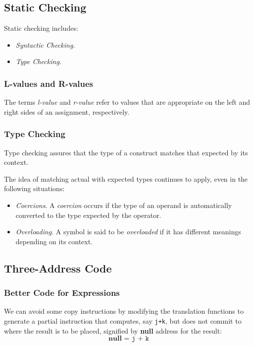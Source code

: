 \documentclass[a4paper,twoside]{book}
\begin{document}
\subsection{Static Checking}

Static checking includes:
\begin{itemize}
    \item\textit{Syntactic Checking}.
    \item\textit{Type Checking}.
\end{itemize}

\subsubsection{L-values and R-values}

The terms \textit{l-value} and \textit{r-value} refer to values that are appropriate on the left and right sides of an assignment, respectively.

\subsubsection{Type Checking}

Type checking assures that the type of a construct matches that expected by its context.

The idea of matching actual with expected types continues to apply, even in the following situations:
\begin{itemize}
    \item\textit{Coercions}. A \textit{coercion} occurs if the type of an operand is automatically converted to the type expected by the operator.
    \item\textit{Overloading}. A symbol is said to be \textit{overloaded} if it has different meanings depending on its context.
\end{itemize}

\subsection{Three-Address Code}
\subsubsection{Better Code for Expressions}

We can avoid some copy instructions by modifying the translation functions to generate a partial instruction that computes, say \texttt{j+k}, but does not commit to where the result is to be placed, signified by \textbf{null} address for the result:
\begin{equation}
    \textbf{null}\texttt{ = j + k}
\end{equation}
\end{document}
